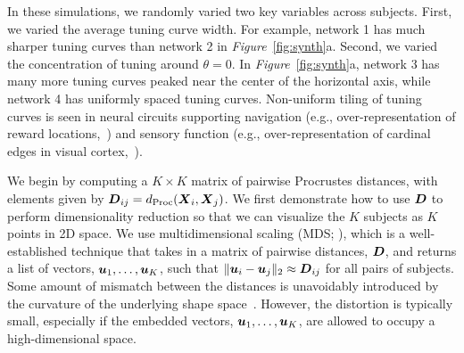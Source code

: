 In these simulations, we randomly varied two key variables across subjects.
First, we varied the average tuning curve width.
For example, network 1 has much sharper tuning curves than network 2 in \textit{Figure}~\ref{fig:synth}a.
Second, we varied the concentration of tuning around $\theta=0$.
In \textit{Figure}~\ref{fig:synth}a, network 3 has many more tuning curves peaked near the center of the horizontal axis, while network 4 has uniformly spaced tuning curves.
Non-uniform tiling of tuning curves is seen in neural circuits supporting navigation (e.g., over-representation of reward locations,~\cite{Hollup2001}) and sensory function (e.g., over-representation of cardinal edges in visual cortex,~\cite{Li2003}).

We begin by computing a $K \times K$ matrix of pairwise Procrustes distances, with elements given by $\boldsymbol{D}_{ij} = d_{\text{Proc}}(\boldsymbol{X}_i, \boldsymbol{X}_j)$.
We first demonstrate how to use $\boldsymbol{D}$ to perform dimensionality reduction so that we can visualize the $K$ subjects as $K$ points in 2D space.
We use multidimensional scaling (MDS; \cite{Borg2005-gk}), which is a well-established technique that takes in a matrix of pairwise distances, $\boldsymbol{D}$, and returns a list of vectors, $\boldsymbol{u}_1, \dots, \boldsymbol{u}_K$, such that $\Vert \boldsymbol{u}_i - \boldsymbol{u}_j \Vert_2 \approx \boldsymbol{D}_{ij}$ for all pairs of subjects.
Some amount of mismatch between the distances is unavoidably introduced by the curvature of the underlying shape space~\parencite{Robinson2006-vn,kendall2009shape}.
However, the distortion is typically small, especially if the embedded vectors, $\boldsymbol{u}_1, \dots, \boldsymbol{u}_K$, are allowed to occupy a high-dimensional space.

